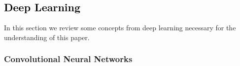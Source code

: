 \documentclass[10pt,a4paper]{article}
\begin{document}
\subsection{\textcolor{black}{Deep Learning}}


In this section we review some concepts from deep learning necessary for the understanding of this paper.


\subsubsection{Convolutional Neural Networks}
\end{document}
